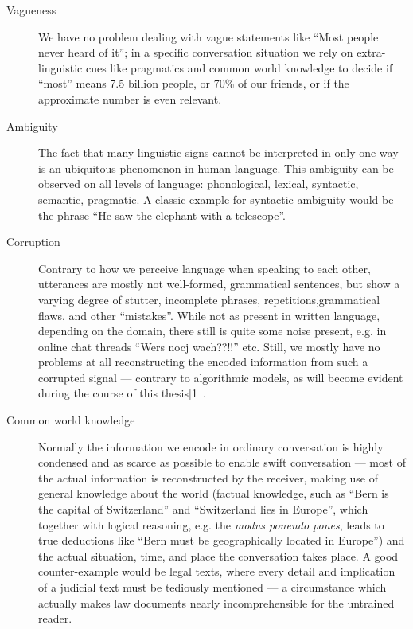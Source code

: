 \begin{description}
  \item[Vagueness] We have no problem dealing with vague statements like ``Most people never heard of it''; in a
    specific conversation situation we rely on extra-linguistic cues like pragmatics and common
    world knowledge to decide if ``most'' means 7.5 billion people, or 70\% of our friends, or if
    the approximate number is even relevant.
  \item[Ambiguity] The fact that many linguistic signs cannot be interpreted in only one way is an ubiquitous
    phenomenon in human language. This ambiguity can be observed on all levels of language: phonological, lexical, syntactic,
    semantic, pragmatic. A classic example for syntactic ambiguity would be the phrase ``He saw
    the elephant with a telescope''.
  \item[Corruption] Contrary to how we perceive language when speaking to each other, utterances are mostly
    not well-formed, grammatical sentences, but show a varying degree of stutter, incomplete
    phrases, repetitions,grammatical flaws, and other ``mistakes''. While not as present in
    written language, depending on the domain, there still is quite some noise present, e.g.
    in online chat threads ``Wers nocj wach??!!'' etc. Still, we mostly have no problems at
    all reconstructing the encoded information from such a corrupted signal --- contrary to
    algorithmic models, as will become evident during the course of this thesis[1~.
  \item[Common world knowledge] Normally the information we encode in ordinary conversation is highly condensed and as scarce
    as possible to enable swift conversation --- most of the actual information is reconstructed by the receiver, making use
    of general knowledge about the world (factual knowledge, such as ``Bern is the capital of
    Switzerland'' and ``Switzerland lies in Europe'', which together with logical reasoning, e.g.
    the \textit{modus ponendo pones}, leads to true deductions like ``Bern must be geographically
    located in Europe'') and the actual situation, time, and place the conversation takes place.
    A good counter-example would be legal texts, where every detail and implication of a judicial text
    must be tediously mentioned --- a circumstance which actually makes law documents nearly incomprehensible for the
    untrained reader.

\end{description}

